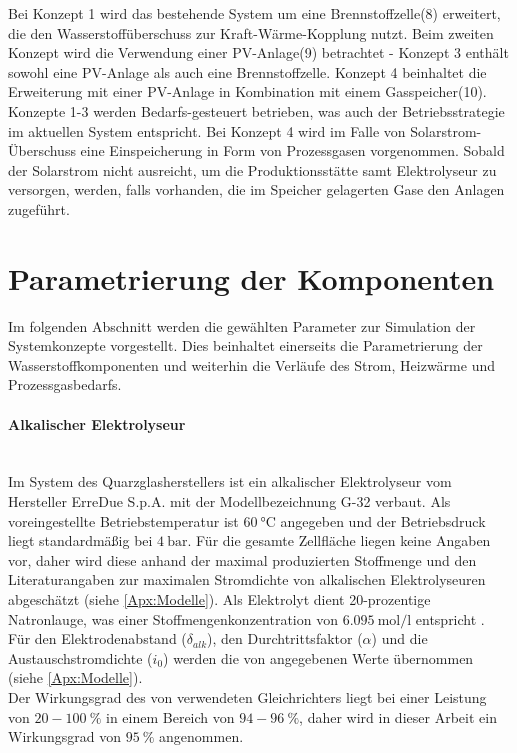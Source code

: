 Bei Konzept 1 wird das bestehende System um eine Brennstoffzelle(8) erweitert, die den Wasserstoffüberschuss zur Kraft-Wärme-Kopplung nutzt. Beim zweiten Konzept wird die Verwendung einer PV-Anlage(9) betrachtet - Konzept 3 enthält sowohl eine PV-Anlage als auch eine Brennstoffzelle. Konzept 4 beinhaltet die Erweiterung mit einer PV-Anlage in Kombination mit einem Gasspeicher(10).\\ 
    
Konzepte 1-3 werden Bedarfs-gesteuert betrieben, was auch der Betriebsstrategie im aktuellen System entspricht. Bei Konzept 4 wird im Falle von Solarstrom-Überschuss eine Einspeicherung in Form von Prozessgasen vorgenommen. Sobald der Solarstrom nicht ausreicht, um die Produktionsstätte samt Elektrolyseur zu versorgen, werden, falls vorhanden, die im Speicher gelagerten Gase den Anlagen zugeführt.

\section{Parametrierung der Komponenten}
Im folgenden Abschnitt werden die gewählten Parameter zur Simulation der Systemkonzepte vorgestellt. Dies beinhaltet einerseits die Parametrierung der Wasserstoffkomponenten und weiterhin die Verläufe des Strom, Heizwärme und Prozessgasbedarfs.

\paragraph{Alkalischer Elektrolyseur}\ \\
Im System des Quarzglasherstellers ist ein alkalischer Elektrolyseur vom Hersteller ErreDue S.p.A. mit der Modellbezeichnung G-32 verbaut. Als voreingestellte Betriebstemperatur ist $\SI{60}{\degreeCelsius}$ angegeben und der Betriebsdruck liegt standardmäßig bei $\SI{4}{\bar}$.
Für die gesamte Zellfläche liegen keine Angaben vor, daher wird diese anhand der maximal produzierten Stoffmenge und den Literaturangaben zur maximalen Stromdichte von alkalischen Elektrolyseuren abgeschätzt (siehe \ref{Apx:Modelle}). Als Elektrolyt dient 20-prozentige Natronlauge, was einer Stoffmengenkonzentration von $\SI{6,095}{\mol\per\l}$ entspricht \citep{periodensystem-online_dichtewerttabelle_nodate-1}.\\
Für den Elektrodenabstand ($\delta_{alk}$), den Durchtrittsfaktor ($\alpha$) und die Austauschstromdichte ($i_0$) werden die von \citet{milewski_modeling_2014} angegebenen Werte übernommen (siehe \ref{Apx:Modelle}).\\ 
Der Wirkungsgrad des von \citet[S.~50]{tjarks_pem-elektrolyse-systeme_2017} verwendeten Gleichrichters liegt bei einer Leistung von $20-\SI{100}{\%}$ in einem Bereich von $94-\SI{96}{\%}$, daher wird in dieser Arbeit ein Wirkungsgrad von $\SI{95}{\%}$ angenommen.

